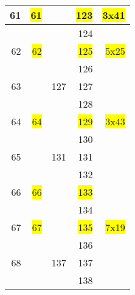 \begin{tabular}{|r|r|r|r|r|}
    \hline               61             &   \colorbox{yellow}{61}&         &    \colorbox{yellow}{123}    &     \colorbox{yellow}{3x41  }  \\
    \hline                              &                        &         &    124    &                                \\
    \hline               62             &   \colorbox{yellow}{62}&         &    \colorbox{yellow}{125}    &     \colorbox{yellow}{5x25  }  \\
    \hline                              &                        &         &    126    &                                \\
    \hline               63             &                        &     127 &    127    &                                \\
    \hline                              &                        &         &    128    &                                \\
    \hline               64             &   \colorbox{yellow}{64}&         &    \colorbox{yellow}{129}    &     \colorbox{yellow}{3x43  }  \\
    \hline                              &                        &         &    130    &                                \\
    \hline               65             &                        &     131 &    131    &                                \\
    \hline                              &                        &         &    132    &                                \\
    \hline               66             &   \colorbox{yellow}{66}&         &    \colorbox{yellow}{133}    &                                \\
    \hline                              &                        &         &    134    &                                \\
    \hline               67             &   \colorbox{yellow}{67}&         &    \colorbox{yellow}{135}    &     \colorbox{yellow}{7x19  }  \\
    \hline                              &                        &         &    136    &                                \\
    \hline               68             &                        &     137 &    137    &                                \\
    \hline                              &                        &         &    138    &                                \\

\end{tabular}
